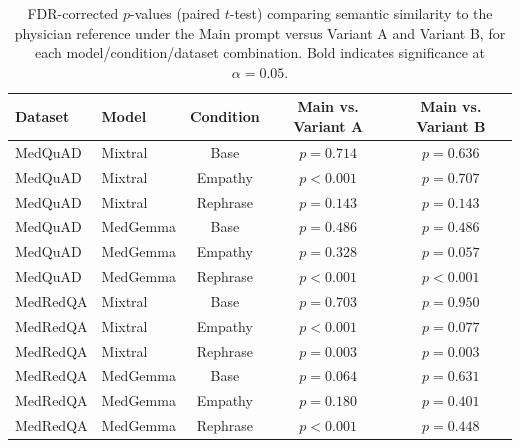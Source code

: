 \begin{table}[t]
\centering
\caption{FDR-corrected $p$-values (paired $t$-test) comparing semantic similarity to the physician reference under the Main prompt versus Variant A and Variant B, for each model/condition/dataset combination. Bold indicates significance at $\alpha=0.05$.}
\label{tab:ablation_pvalues_similarity}
\begin{tabular}{llccc}
\toprule
\textbf{Dataset} & \textbf{Model} & \textbf{Condition} & \textbf{Main vs. Variant A} & \textbf{Main vs. Variant B} \\
\midrule
MedQuAD & Mixtral & Base & $p=0.714$ & $p=0.636$ \\
MedQuAD & Mixtral & Empathy & \textbf{$p<0.001$} & $p=0.707$ \\
MedQuAD & Mixtral & Rephrase & $p=0.143$ & $p=0.143$ \\
MedQuAD & MedGemma & Base & $p=0.486$ & $p=0.486$ \\
MedQuAD & MedGemma & Empathy & $p=0.328$ & $p=0.057$ \\
MedQuAD & MedGemma & Rephrase & \textbf{$p<0.001$} & \textbf{$p<0.001$} \\
MedRedQA & Mixtral & Base & $p=0.703$ & $p=0.950$ \\
MedRedQA & Mixtral & Empathy & \textbf{$p<0.001$} & $p=0.077$ \\
MedRedQA & Mixtral & Rephrase & \textbf{$p=0.003$} & \textbf{$p=0.003$} \\
MedRedQA & MedGemma & Base & $p=0.064$ & $p=0.631$ \\
MedRedQA & MedGemma & Empathy & $p=0.180$ & $p=0.401$ \\
MedRedQA & MedGemma & Rephrase & \textbf{$p<0.001$} & $p=0.448$ \\
\bottomrule
\end{tabular}
\end{table}

